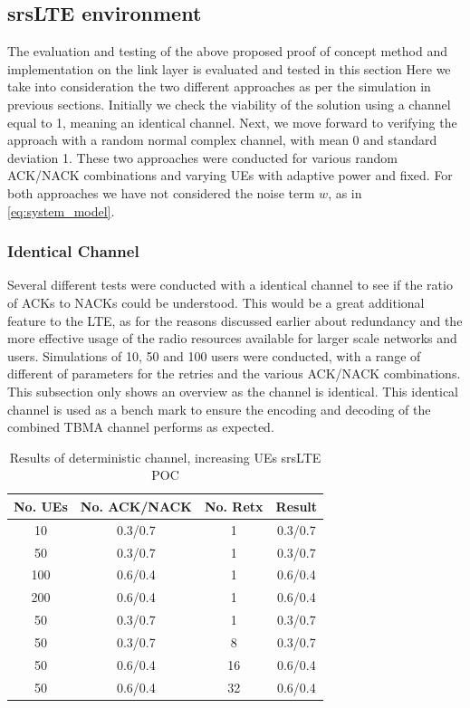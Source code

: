 \documentclass{article}
\begin{document}
\subsection{srsLTE environment}
The evaluation and testing of the above proposed proof of concept method and implementation on the link layer is evaluated and tested in this section Here we take into consideration the two different approaches as per the simulation in previous sections. Initially we check the viability of the solution using a channel equal to 1, meaning an identical channel. Next, we move forward to verifying the approach with a random normal complex channel, with mean 0 and standard deviation 1. These two approaches were conducted for various random ACK/NACK combinations and varying UEs with adaptive power and fixed. For both approaches we have not considered the noise term $w$, as in \cref{eq:system_model}.

\subsubsection{Identical Channel}
Several different tests were conducted with a identical channel to see if the ratio of ACKs to NACKs could be understood. This would be a great additional feature to the LTE, as for the reasons discussed earlier about redundancy and the more effective usage of the radio resources available for larger scale networks and users. Simulations of 10, 50 and 100 users were conducted, with a range of different of parameters for the retries and the various ACK/NACK combinations. This subsection only shows an overview as the channel is identical. This identical channel is used as a bench mark to ensure the encoding and decoding of the combined TBMA channel performs as expected. 

\begin{table}[H]
    \centering
 \begin{tabular}{||c c c c||} 
 \hline
 No. UEs & No. ACK/NACK & No. Retx & Result \\ [0.5ex] 
 \hline\hline
 10 & 0.3/0.7 & 1 &  0.3/0.7 \\ 
 \hline
 50 & 0.3/0.7 & 1 & 0.3/0.7 \\
 \hline
 100 & 0.6/0.4 & 1 & 0.6/0.4 \\
 \hline
 200 & 0.6/0.4 & 1 & 0.6/0.4 \\
 \hline
 50 & 0.3/0.7 & 1 &  0.3/0.7 \\ 
 \hline
 50 & 0.3/0.7 & 8 & 0.3/0.7 \\
 \hline
 50 & 0.6/0.4 & 16 & 0.6/0.4 \\
 \hline
 50 & 0.6/0.4 & 32 & 0.6/0.4 \\ [1ex] 
 \hline
\end{tabular}
    \caption{Results of deterministic channel, increasing UEs srsLTE POC}
    \label{tab:identical_ue_srs}
\end{table}
\end{document}
